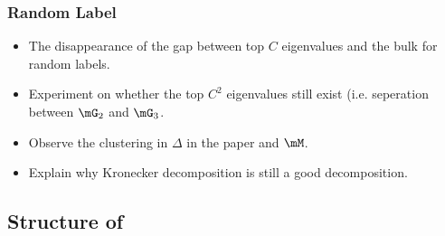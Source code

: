 \subsubsection{Random Label}
\begin{itemize}
    \item The disappearance of the gap between top $C$ eigenvalues and the bulk for random labels.
    \item Experiment on whether the top $C^2$ eigenvalues still exist (i.e. seperation between $\mG_2$ and $\mG_3$.
    \item Observe the clustering in $\Delta$ in the paper and $\mM$.
    \item Explain why Kronecker decomposition is still a good decomposition.
\end{itemize}

\subsection{Structure of \texorpdfstring{\E[\mM]}{EM}}


